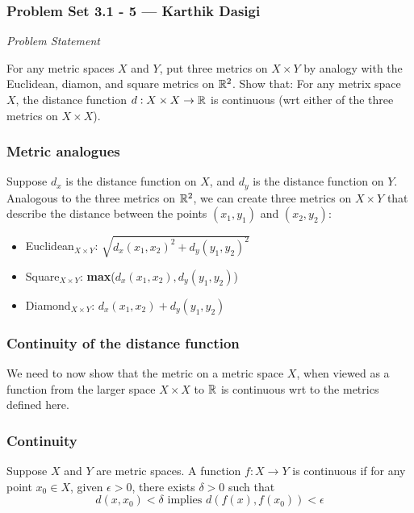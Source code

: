 
\begin{frame}
    \frametitle{Problem Set 3.1 - 5 --- Karthik Dasigi}
    \emph{Problem Statement}

    For any metric spaces \(X\) and \(Y\), put three metrics on \(X \times Y\)
    by analogy with the Euclidean, diamon, and square metrics on \(\mathbb{R}^2\).
    Show that: For any metrix space \(X\), the distance function \(d: X \times X
    \to \mathbb{R}\) is continuous (wrt either of the three metrics on \(X \times
    X\)).
\end{frame}

\begin{frame}
    \frametitle{Metric analogues}

    Suppose \(d_x\) is the distance function on \(X\), and \(d_y\) is the distance function on \(Y\).
    Analogous to the three metrics on \(\mathbb{R}^2\), we can create three metrics on \(X\times Y\) that
    describe the distance between the points \((x_1, y_1)\) and \((x_2, y_2)\):
    \begin{itemize}
        \item Euclidean\(_{X\times Y}\): \(\sqrt{d_x(x_1, x_2)^2 + d_y(y_1, y_2)^2}\)
        \item Square\(_{X\times Y}\): \textbf{max}(\(d_x(x_1, x_2) , d_y(y_1, y_2)\))
        \item Diamond\(_{X\times Y}\): \(d_x(x_1, x_2) + d_y(y_1, y_2)\)
    \end{itemize}

\end{frame}

\begin{frame}
    \frametitle{Continuity of the distance function}

    We need to now show that the metric on a metric space \(X\), when viewed as
    a function from the larger space \(X\times X\) to \(\mathbb{R}\) is continuous
    wrt to the metrics defined here. 

\end{frame}

\begin{frame}

    \frametitle{Continuity}

    \begin{definition}[Continuity]
        Suppose \(X\) and \(Y\) are metric spaces. A function \(f : X \rightarrow Y\)
        is continuous if for any point \(x_0 \in X\), given \(\epsilon > 0\),
        there exists \(\delta > 0\) such that
        \begin{equation}
            d(x,x_0)<\delta \text{ implies } d(f(x), f(x_0))<\epsilon 
        \end{equation}

    \end{definition}
    
\end{frame}

